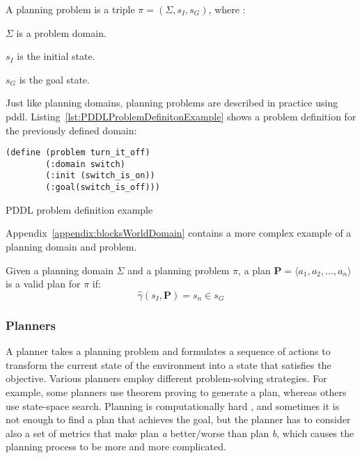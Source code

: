 \begin{Tdef}
    A planning problem is a triple $\pi = (\Sigma,s_I,s_G)$, where :
    \vspace{-0.5em}
    \begin{compactitem}
        \item 
        $\Sigma$ is a problem domain.
        
        \item 
        $s_I$ is the initial state.
        
        \item 
        $s_G$ is the goal state.
    \end{compactitem}
    \vspace{-0.5em}
\end{Tdef}
\vspace{-0.5em}
Just like planning domains, planning problems are described in practice using \gls{pddl}. 
Listing~\ref{lst:PDDLProblemDefinitonExample} shows a problem definition for the previously defined domain:
\begin{Listing}
    \begin{lstlisting}[language=PDDL]
    (define (problem turn_it_off)
        (:domain switch)
        (:init (switch_is_on))
        (:goal(switch_is_off)))
  \end{lstlisting}
    \caption{PDDL problem definition example}
    \label{lst:PDDLProblemDefinitonExample}
\end{Listing}

Appendix~\ref{appendix:blocksWorldDomain} contains a more complex example of a planning domain and problem.

\begin{Tdef}
    Given a planning domain $\Sigma$ and a planning problem $\pi$,
    a plan $\mathbf{P} = \langle a_1,a_2,\dots,a_n\rangle$ is a valid plan for $\pi$ if:
    $$\hat{\gamma}(s_I,\mathbf{P}) = s_n \in s_G$$
\end{Tdef}

\subsubsection{Planners}

A planner takes a planning problem and formulates a sequence of actions 
to transform the current state of the environment into a state 
that satisfies the objective. Various planners employ different problem-solving strategies. 
For example, some planners use theorem proving \cite{PlanningSatisfiabilitykautz1992} 
to generate a plan, whereas others use state-space search. 
Planning is computationally hard 
\cite{ComplexityDecidabilityUndecidabilityerol1995}, and 
sometimes it is not enough to find a plan that achieves the goal, 
but the planner has to consider also a set of metrics that make plan 
\textit{a} better/worse than plan \textit{b}, which causes the planning process to be more and more complicated.
